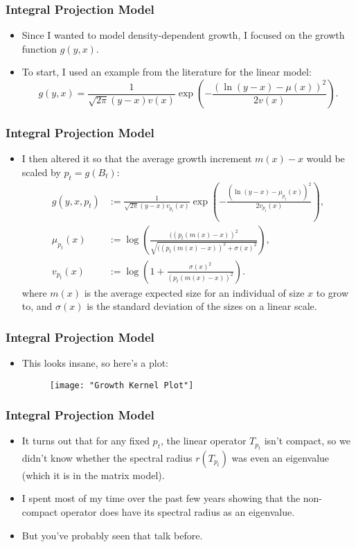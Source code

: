 \documentclass{beamer}
\begin{document}
\begin{frame}
	\frametitle{Integral Projection Model}
	\begin{itemize}
		\pause
		\item Since I wanted to model density-dependent growth, I focused on the growth function $g(y, x)$.
		\pause
		\item To start, I used an example from the literature for the linear model:
		\[	g(y, x) = \frac{1}{\sqrt{2 \pi}(y - x) v(x)} \exp  \left( - \frac{(\ln(y - x) - \mu(x))^2}{2 v(x)} \right).\]
	\end{itemize}
\end{frame}

\begin{frame}
	\frametitle{Integral Projection Model}
	\begin{itemize}
		\pause
		\item I then altered it so that the average growth increment $m(x) - x$ would be scaled by $p_t = g(B_t)$:
		\pause
		\begin{align*}
			g(y, x, p_t) &:= \frac{1}{\sqrt{2 \pi}(y - x) v_{p_t}(x)} \exp \left( - \frac{(\ln(y - x) - \mu_{p_t}(x))^2}{2 v_{p_t}(x)} \right), \\
			\mu_{p_t}(x) &:= \log \left( \frac{((p_t(m(x)-x))^2}{\sqrt{((p_t(m(x) - x))^2 + \sigma(x)^2}}\right),\\
			v_{p_t}(x) &:= \log \left( 1 + \frac{\sigma(x)^2}{(p_t(m(x)-x))^2}\right).
		\end{align*}
		\pause where $m(x)$ is the average expected size for an individual of size $x$ to grow to, and $\sigma(x)$ is the standard deviation of the sizes on a linear scale.
	\end{itemize}
\end{frame}

\begin{frame}
	\frametitle{Integral Projection Model}
	\begin{itemize}
		\item This looks insane, so here's a plot:
\begin{figure}
	\centering
	\texttt{[image: "Growth Kernel Plot"]}
\end{figure}
	\end{itemize}
\end{frame}

\begin{frame}
	\frametitle{Integral Projection Model}
	\begin{itemize}
		\pause
		\item It turns out that for any fixed $p_t$, the linear operator $T_{p_t}$ isn't compact, so we didn't know whether the spectral radius $r(T_{p_t})$ was even an eigenvalue (which it is in the matrix model).
		\pause
		\item I spent most of my time over the past few years showing that the non-compact operator does have its spectral radius as an eigenvalue.
		\pause
		\item But you've probably seen that talk before.
	\end{itemize}
\end{frame}
\end{document}
